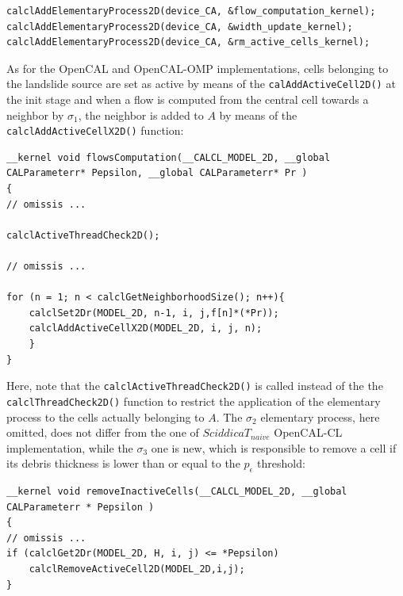 \begin{lstlisting}
calclAddElementaryProcess2D(device_CA, &flow_computation_kernel);
calclAddElementaryProcess2D(device_CA, &width_update_kernel);
calclAddElementaryProcess2D(device_CA, &rm_active_cells_kernel);
\end{lstlisting}

\noindent As for the OpenCAL and OpenCAL-OMP implementations,
cells belonging to the landslide source are set as active by means
of the \verb'calAddActiveCell2D()' at the init stage and when a
flow is computed from the central cell towards a neighbor by
$\sigma_1$, the neighbor is added to $A$ by means of the
\verb'calclAddActiveCellX2D()' function:

\begin{lstlisting}
__kernel void flowsComputation(__CALCL_MODEL_2D, __global CALParameterr* Pepsilon, __global CALParameterr* Pr )
{
// omissis ...

calclActiveThreadCheck2D();

// omissis ...

for (n = 1; n < calclGetNeighborhoodSize(); n++){
	calclSet2Dr(MODEL_2D, n-1, i, j,f[n]*(*Pr));
	calclAddActiveCellX2D(MODEL_2D, i, j, n);
	}
}
\end{lstlisting}

\noindent Here, note that the \verb'calclActiveThreadCheck2D()' is
called instead of the the \verb'calclThreadCheck2D()' function to
restrict the application of the elementary process to the cells
actually belonging to $A$. The $\sigma_2$ elementary process, here
omitted, does not differ from the one of $SciddicaT_{naive}$
OpenCAL-CL implementation, while the $\sigma_3$ one is new, which
is responsible to remove a cell if its debris thickness is lower
than or equal to the $p_\epsilon$ threshold:

\begin{lstlisting}
__kernel void removeInactiveCells(__CALCL_MODEL_2D, __global CALParameterr * Pepsilon )
{
// omissis ...
if (calclGet2Dr(MODEL_2D, H, i, j) <= *Pepsilon)
	calclRemoveActiveCell2D(MODEL_2D,i,j);
}
\end{lstlisting}

